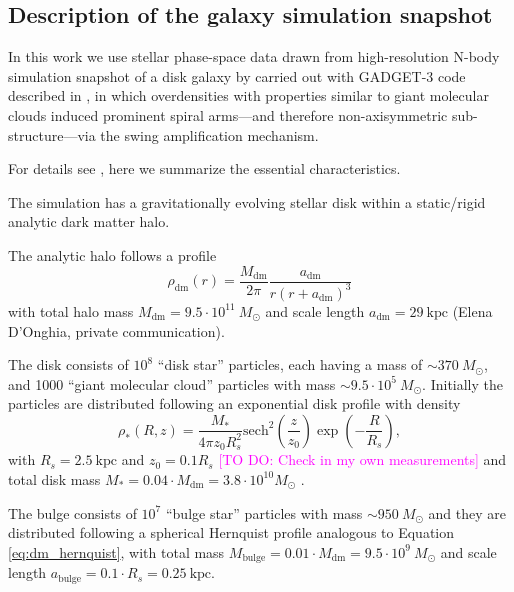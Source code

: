 \documentclass[iop,revtex4,numberedappendix,appendixfloats]{emulateapj}
\newcommand{\Wilma}[1]{\textcolor{Magenta}{#1}}
\begin{document}
\subsection{Description of the galaxy simulation snapshot} \label{sec:simulation_description}

In this work we use stellar phase-space data drawn from high-resolution N-body simulation snapshot of a disk galaxy by \citet{2013ApJ...766...34D} carried out with GADGET-3 code described in \citet{2005MNRAS.361..776S}, in which overdensities with properties similar to giant molecular clouds induced prominent spiral arms---and therefore non-axisymmetric sub-structure---via the swing amplification mechanism. 

For details see \citet{2013ApJ...766...34D}, here we summarize the essential characteristics.

The simulation has a gravitationally evolving stellar disk within a static/rigid analytic dark matter halo.

The analytic halo follows a \citet{1990ApJ...356..359H} profile
\begin{equation}
\rho_\text{dm}(r) = \frac{M_\text{dm}}{2\pi} \frac{a_\text{dm}}{r (r+a_\text{dm})^3} \label{eq:dm_hernquist}
\end{equation}
with total halo mass $M_\text{dm} = 9.5\cdot 10^{11} ~M_\odot$ and scale length $a_\text{dm} = 29~\text{kpc}$ (Elena D'Onghia, private communication).

The disk consists of $10^8$ ``disk star'' particles, each having a mass of $\sim370 ~M_\odot$, and 1000 ``giant molecular cloud'' particles with mass $\sim9.5\cdot 10^{5} ~M_\odot$. Initially the particles are distributed following an exponential disk profile with density
\begin{equation}
\rho_*(R,z) = \frac{M_*}{4\pi z_0 R_s^2} \text{sech}^2 \left( \frac{z}{z_0}\right) \exp \left(- \frac{R}{R_s} \right), \label{eq:sech_disk}
\end{equation}
with $R_s = 2.5~\text{kpc}$ and $z_0=0.1R_s$ \Wilma{[TO DO: Check in my own measurements]} and total disk mass $M_* = 0.04\cdot M_\text{dm} = 3.8\cdot 10^{10} M_\odot$ .

The bulge consists of $10^7$ ``bulge star'' particles with mass $\sim950 ~M_\odot$ and they are distributed following a spherical Hernquist profile analogous to Equation \eqref{eq:dm_hernquist}, with total mass $M_\text{bulge}=0.01 \cdot M_\text{dm} = 9.5\cdot 10^9~M_\odot$ and scale length $a_\text{bulge}=0.1\cdot R_s=0.25~\text{kpc}$.
\end{document}
